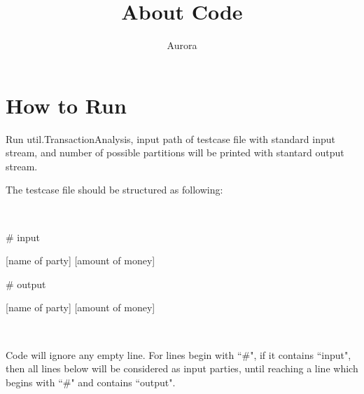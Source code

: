 \documentclass[]{article}
\title{About Code}
\author{Aurora}
\begin{document}
\maketitle

\section{How to Run}
Run util.TransactionAnalysis, input path of testcase file with standard input stream, and number of possible partitions will be printed with stantard output stream.

The testcase file should be structured as following: 

\ 

		\# input 
		
		[name of party] [amount of money]
		
		\# output 
		
		[name of party] [amount of money]
		
\ 

Code will ignore any empty line. For lines begin with ``\#", if it contains ``input", then all lines below will be considered as input parties, until reaching a line which begins with ``\#" and contains ``output".
\end{document}
